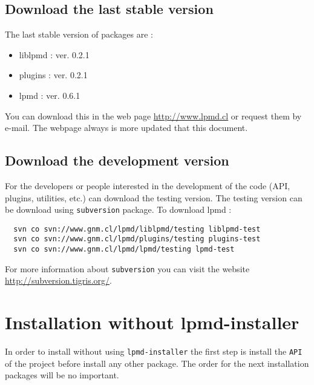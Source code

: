 \subsection{Download the last stable version}

The last stable version of {\lpmd} packages are :

\begin{itemize}
 \item liblpmd : ver. 0.2.1
 \item plugins : ver. 0.2.1
 \item lpmd    : ver. 0.6.1
\end{itemize}

You can download this in the web page \url{http://www.lpmd.cl} or request them 
by e-mail. The webpage always is more updated that this document.

\subsection{Download the development version}

For the developers or people interested in the development of the code (API,
plugins, utilities, etc.) can download the testing version. The testing version
can be download using \verb|subversion| package. To download lpmd :

\begin{center}
 \begin{verbatim}
  svn co svn://www.gnm.cl/lpmd/liblpmd/testing liblpmd-test
  svn co svn://www.gnm.cl/lpmd/plugins/testing plugins-test
  svn co svn://www.gnm.cl/lpmd/lpmd/testing lpmd-test
 \end{verbatim}
\end{center}

For more information about \verb|subversion| you can visit the website
\url{http://subversion.tigris.org/}.

\section{Installation without lpmd-installer}

In order to install {\lpmd} without using \verb|lpmd-installer| the first step
is install the \verb|API| of the project before install any other package. The
order for the next installation packages will be no important.

